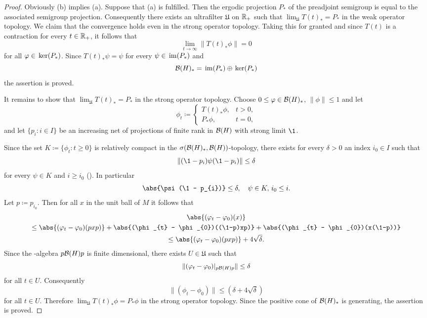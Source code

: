 \begin{proof}
Obviously (b) implies (a).
Suppose that (a) is fulfilled.
Then the ergodic projection $ P_{*} $  of the preadjoint semigroup is equal to the associated semigroup projection.
Consequently there exists an ultrafilter $ \mathfrak{U} $  on $ \mathbb{R}_{+} $  such that $ \lim_{\mathfrak{U}} T(t)_{*} = P_{*} $  in the weak operator topology.
We claim that the convergence holds even in the strong operator topology.
Taking this for granted and since $ T(t) $ is a contraction for every $ t \in \mathbb{R}_{+} $, it follows that
\[
\lim_{t \to \infty} \|T(t)_{*}\phi\| = 0
\]
for all $ \phi \in \Kern{P_{*}} $.
Since $ T(t)_{*}\psi = \psi $  for every 
$ \psi \in \mathop{}\mathrm{im}(P_{*}) $  and
\[
\mathcal{B}(H)_{*} = \mathop{}\mathrm{im}(P_{*}) \oplus \mathop{}\mathrm{ker}(P_{*})
\]
the assertion is proved.

It remains to show that $ \lim_{\mathfrak{U}} T(t)_{*} = P_{*} $  in the strong operator topology.
Choose $ 0 \leq \phi \in \BH_{*} $, $ \|\phi\| \leq 1 $  and let 
%
\[
	\phi_{t} \coloneqq 
	\begin{cases}
	T(t)_{*}\phi ,	&   t > 0 , \\
	P_{*}\phi	,	&   t = 0, 
	\end{cases} 
\]
%
and let $ \{p_{i} \colon i \in I\} $  be an increasing net of projections of finite rank in $ \mathcal{B}(H) $  with strong limit $\1$.

Since the set $ K \coloneqq \{\phi_{t} \colon t \geq 0\} $  is relatively compact in the $ \sigma(\mathcal{B}(H)_{*},\mathcal{B}(H)) $-topology, there exists for every $ \delta > 0 $  an index $ i_{0} \in I $  such that
\[
\|(\1 - p_{i})\psi(\1 - p_{i})\| \leq \delta
\]
for every $ \psi \in K $  and $ i \geq i_{0} $  (\textcite[Theorem III.5.4.(vi)]{takesaki:1979}).
In particular
\[
\abs{\psi(\1 - p_{i})} \leq \delta, \quad \psi \in K,\, i_{0} \leq i.
\]
Let $ p \coloneqq p_{i_{0}} $.
Then for all $ x $  in the unit ball of\/ $ M $  it follows that
\begin{gather*}
\abs{(\phi_{t} - \phi_{0})(x)}  \\
\leq \abs{(\phi_{t} - \phi_{0})(pxp)} 
     + \abs{(\phi_{t} - \phi_{0})((\1-p)xp)} 
+ \abs{(\phi_{t} - \phi_{0})(x(\1-p))} \\
     \leq 
 \abs{(\phi_{t} - \phi_{0})(pxp)} + 4\sqrt{\delta} .
\end{gather*}
Since the \WA-algebra $ p \mathcal{B}(H) p $  is finite dimensional, there exists $ U \in \mathfrak{U} $  such that
\[
	\|(\phi_{t} - \phi_{0})\vert_{p \BH p} \| \leq \delta
\]
for all $ t \in U $.
Consequently
\[
\|(\phi_{t} - \phi_{0})\| \leq (\delta + 4\sqrt{\delta})
\]
for all $ t \in U $.
Therefore $ \lim_{\mathfrak{U}} T(t)_{*}\phi = P_{*}\phi $  in the strong operator topology.
Since the positive cone of\/ $ \mathcal{B}(H)_{*} $  is generating, the assertion is proved.
\end{proof}
